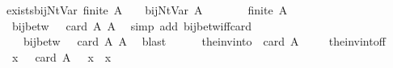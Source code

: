 \begin{isabellebody}
\isanewline
{}\isamarkupfalse%
\ exists{\isacharunderscore}{\kern0pt}bij{\isacharunderscore}{\kern0pt}Nt{\isacharunderscore}{\kern0pt}Var{\isacharcolon}{\kern0pt}\ {\isachardoublequoteopen}finite\ A\ {\isasymLongrightarrow}\ {\isasymexists}{\isasymgamma}\ {\isasymgamma}{\isacharprime}{\kern0pt}{\isachardot}{\kern0pt}\ bij{\isacharunderscore}{\kern0pt}Nt{\isacharunderscore}{\kern0pt}Var\ A\ {\isasymgamma}\ {\isasymgamma}{\isacharprime}{\kern0pt}{\isachardoublequoteclose}\isanewline
%
\isadelimproof
%
\endisadelimproof
%
\isatagproof
{}\isamarkupfalse%
\ {\isacharminus}{\kern0pt}\isanewline
\ \ \isamarkupfalse%
\ {\isachardoublequoteopen}finite\ A{\isachardoublequoteclose}\isanewline
\ \ \isamarkupfalse%
\ \isamarkupfalse%
\ {\isachardoublequoteopen}{\isasymexists}{\isasymgamma}{\isachardot}{\kern0pt}\ bij{\isacharunderscore}{\kern0pt}betw\ {\isasymgamma}\ {\isacharbraceleft}{\kern0pt}{\isachardot}{\kern0pt}{\isachardot}{\kern0pt}{\isacharless}{\kern0pt}\ card\ A{\isacharbraceright}{\kern0pt}\ A{\isachardoublequoteclose}\ \isamarkupfalse%
\ {\isacharparenleft}{\kern0pt}simp\ add{\isacharcolon}{\kern0pt}\ bij{\isacharunderscore}{\kern0pt}betw{\isacharunderscore}{\kern0pt}iff{\isacharunderscore}{\kern0pt}card{\isacharparenright}{\kern0pt}\isanewline
\ \ \isamarkupfalse%
\ \isamarkupfalse%
\ {\isasymgamma}\ \ {}{\isacharcolon}{\kern0pt}\ {\isachardoublequoteopen}bij{\isacharunderscore}{\kern0pt}betw\ {\isasymgamma}\ {\isacharbraceleft}{\kern0pt}{\isachardot}{\kern0pt}{\isachardot}{\kern0pt}{\isacharless}{\kern0pt}\ card\ A{\isacharbraceright}{\kern0pt}\ A{\isachardoublequoteclose}\ \isamarkupfalse%
\ blast\isanewline
\ \ \isamarkupfalse%
\ {\isacharquery}{\kern0pt}{\isasymgamma}{\isacharprime}{\kern0pt}\ {\isacharequal}{\kern0pt}\ {\isachardoublequoteopen}the{\isacharunderscore}{\kern0pt}inv{\isacharunderscore}{\kern0pt}into\ {\isacharbraceleft}{\kern0pt}{\isachardot}{\kern0pt}{\isachardot}{\kern0pt}{\isacharless}{\kern0pt}\ card\ A{\isacharbraceright}{\kern0pt}\ {\isasymgamma}{\isachardoublequoteclose}\isanewline
\ \ \isamarkupfalse%
\ the{\isacharunderscore}{\kern0pt}inv{\isacharunderscore}{\kern0pt}into{\isacharunderscore}{\kern0pt}f{\isacharunderscore}{\kern0pt}f\ {}\ \isamarkupfalse%
\ {}{\isacharcolon}{\kern0pt}\ {\isachardoublequoteopen}{\isasymforall}x\ {\isasymin}\ {\isacharbraceleft}{\kern0pt}{\isachardot}{\kern0pt}{\isachardot}{\kern0pt}{\isacharless}{\kern0pt}\ card\ A{\isacharbraceright}{\kern0pt}{\isachardot}{\kern0pt}\ {\isacharquery}{\kern0pt}{\isasymgamma}{\isacharprime}{\kern0pt}\ {\isacharparenleft}{\kern0pt}{\isasymgamma}\ x{\isacharparenright}{\kern0pt}\ {\isacharequal}{\kern0pt}\ x{\isachardoublequoteclose}\ \isamarkupfalse%

\end{isabellebody}
